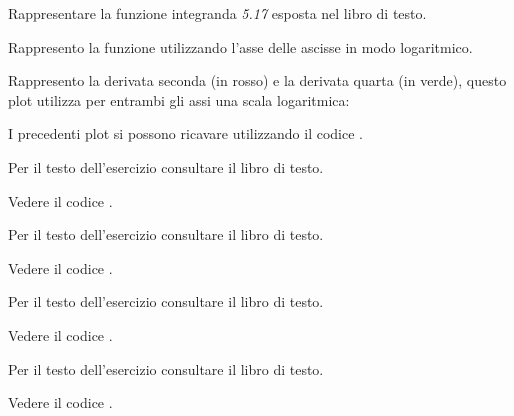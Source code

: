 \begin{exercise}
Rappresentare la funzione integranda \emph{5.17} esposta nel libro
di testo.
\end{exercise}
Rappresento la funzione utilizzando l'asse delle ascisse in modo logaritmico.
\begin{center}   

\end{center}
Rappresento la derivata seconda (in rosso) e la derivata quarta (in verde),
questo plot utilizza per entrambi gli assi una scala logaritmica:
\begin{center}   

\end{center} 
I precedenti plot si possono ricavare utilizzando il codice
.

\begin{exercise}[5.4] 
Per il testo dell'esercizio consultare il libro di testo.
\end{exercise}
Vedere il codice .

\begin{exercise}[5.5] 
Per il testo dell'esercizio consultare il libro di testo.
\end{exercise}
Vedere il codice .

\begin{exercise}[5.6] 
Per il testo dell'esercizio consultare il libro di testo.
\end{exercise}
Vedere il codice .

\begin{exercise}[5.7] 
Per il testo dell'esercizio consultare il libro di testo.
\end{exercise}
Vedere il codice .

